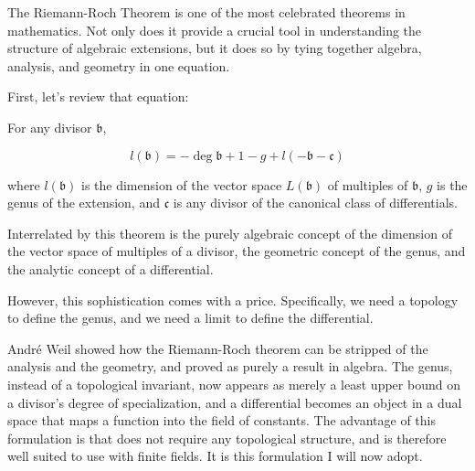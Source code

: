 The Riemann-Roch Theorem is one of the most celebrated theorems in
mathematics.  Not only does it provide a crucial tool in understanding
the structure of algebraic extensions, but it does so by tying
together algebra, analysis, and geometry in one equation.

First, let's review that equation:


% 
% 

For any divisor $\mathfrak{b}$,


$$l(\mathfrak{b}) = - \deg \mathfrak{b} + 1 - g + l(-\mathfrak{b}-\mathfrak{c}) $$

where $l(\mathfrak{b})$ is the dimension of the vector space
$L(\mathfrak{b})$ of multiples of $\mathfrak{b}$, $g$ is the genus of
the extension, and $\mathfrak{c}$ is any divisor of the canonical class of
differentials.

\endtheorem

Interrelated by this theorem is the purely algebraic concept of the
dimension of the vector space of multiples of a divisor, the geometric
concept of the genus, and the analytic concept of a differential.

However, this sophistication comes with a price.  Specifically, we
need a topology to define the genus, and we need a limit to define the
differential.

Andr\'e Weil showed how the Riemann-Roch theorem can be stripped of
the analysis and the geometry, and proved as purely a result in
algebra.  The genus, instead of a topological invariant, now appears
as merely a least upper bound on a divisor's degree of specialization,
and a differential becomes an object in a dual space that maps a
function into the field of constants.  The advantage of this
formulation is that does not require any topological structure, and is
therefore well suited to use with finite fields.  It is this
formulation I will now adopt.

